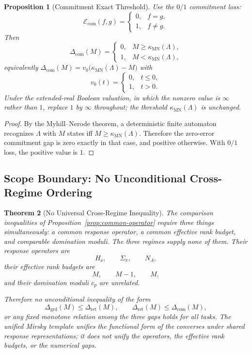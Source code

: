 \documentclass[12pt]{article}
\newtheorem{theorem}{Theorem}[section]
\newtheorem{proposition}[theorem]{Proposition}
\theoremstyle{definition}
\newcommand{\Com}{\Delta_{\mathrm{com}}}
\newcommand{\kappaMN}{\kappa_{\mathrm{MN}}}
\begin{document}
\begin{proposition}[Commitment Exact Threshold]
\label{prop:com-threshold}
Use the $0/1$ commitment loss:
\[
\mathcal E_{\mathrm{com}}(f,g)
=
\begin{cases}
0,& f=g,\\
1,& f\neq g.
\end{cases}
\]
Then
\[
\Com(M)
=
\begin{cases}
0,& M\ge \kappaMN(\Lambda),\\
1,& M<\kappaMN(\Lambda),
\end{cases}
\]
equivalently $\Com(M)=v_0\bigl(\kappaMN(\Lambda)-M\bigr)$ with
\[
v_0(t)=
\begin{cases}
0,& t\le0,\\
1,& t>0.
\end{cases}
\]
Under the extended-real Boolean valuation, in which the nonzero value is
$\infty$ rather than $1$, replace $1$ by $\infty$ throughout; the threshold
$\kappaMN(\Lambda)$ is unchanged.
\end{proposition}

\begin{proof}
By the Myhill--Nerode theorem, a deterministic finite automaton recognizes
$\Lambda$ with $M$ states iff $M\ge\kappaMN(\Lambda)$.  Therefore the
zero-error commitment gap is zero exactly in that case, and positive otherwise.
With $0/1$ loss, the positive value is $1$.
\end{proof}

\subsection{Scope Boundary: No Unconditional Cross-Regime Ordering}
\label{subsec:schatten-nogo}

\begin{theorem}[No Universal Cross-Regime Inequality]
\label{thm:schatten-nogo}
The comparison inequalities of Proposition~\ref{prop:common-operator} require
three things simultaneously: a common response operator, a common effective
rank budget, and comparable domination moduli.  The three regimes supply none
of them.  Their response operators are
\[
H_\nu,
\qquad
\Sigma_\pi,
\qquad
N_\Lambda,
\]
their effective rank budgets are
\[
M,
\qquad
M-1,
\qquad
M,
\]
and their domination moduli $c_p$ are unrelated.

Therefore no unconditional inequality of the form
\[
\Delta_{\mathrm{grd}}(M)\le \Delta_{\mathrm{ret}}(M),
\qquad
\Delta_{\mathrm{ret}}(M)\le \Delta_{\mathrm{com}}(M),
\]
or any fixed monotone relation among the three gaps holds for all tasks.  The
unified Mirsky template unifies the functional \emph{form} of the converses
under shared response representations; it does not unify the operators, the
effective rank budgets, or the numerical gaps.
\end{theorem}
\end{document}
